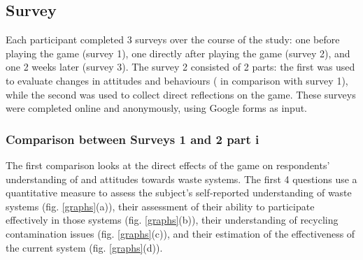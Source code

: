 \documentclass[nofonts,nols,justified,nobib]{tufte-book}
\begin{document}
\subsection*{Survey}
Each participant completed 3 surveys over the course of the study: one before playing the game (survey 1), one directly after playing the game (survey 2), and one 2 weeks later (survey 3). The survey 2 consisted of 2 parts: the first was used to evaluate changes in attitudes and behaviours ( in comparison with survey 1), while the second was used to collect direct reflections on the game. These surveys were completed online and anonymously, using Google forms as input. 

\subsubsection*{Comparison between Surveys 1 and 2 part i}
The first comparison looks at the direct effects of the game on respondents' understanding of and attitudes towards waste systems. The first 4 questions use a quantitative measure to assess the subject's self-reported understanding of waste systems (fig. \ref{graphs}(a)), their assessment of their ability to participate effectively in those systems (fig. \ref{graphs}(b)), their understanding of recycling contamination issues (fig. \ref{graphs}(c)), and their estimation of the effectiveness of the current system (fig. \ref{graphs}(d)).
\end{document}
